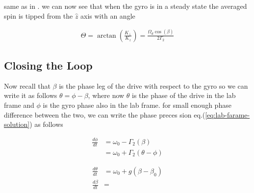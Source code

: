 \documentclass{article}
\begin{document}
same as in \cite{walker2016spin}. we can now see that when the gyro is in a steady state the averaged spin is tipped from the $\hat{z}$ axis with an angle

\begin{align}
    \Theta = \arctan\left(\frac{K_{\perp}}{K_z}\right)=\frac{\Omega_d \cos{\left(\beta\right)}}{2\Gamma_2}
\end{align}

\subsection{Closing the Loop}
Now recall that $\beta$ is the phase leg of the drive with respect to the gyro so we can write it as follows $\theta=\phi - \beta$, where now $\theta$ is the phase of the drive in the lab frame and $\phi$ is the gyro phase also in the lab frame. for small enough phase difference between the two, we can write the phase preces
sion eq.(\ref{eq:lab-farame-solution}) as follows

\begin{align}
    \frac{d\phi}{dt} &= \omega_0 - \Gamma_2\left(\beta\right)\\
    &= \omega_0 + \Gamma_2\left(\theta - \phi\right)
\end{align}

\begin{align}
    \frac{d\theta}{dt} &= \omega_0 + g\left(\beta - \beta_0\right)\\
    \frac{d\beta}{dt} &=
\end{align}



\end{document}
